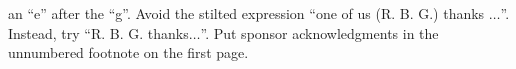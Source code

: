 \documentclass[conference]{IEEEtran}
\begin{document}
 an ``e'' after the ``g''. Avoid the stilted expression ``one of us (R. B. 
 G.) thanks $\ldots$''. Instead, try ``R. B. G. thanks$\ldots$''. Put sponsor 
 acknowledgments in the unnumbered footnote on the first page.



 
 
% 
\end{document}
